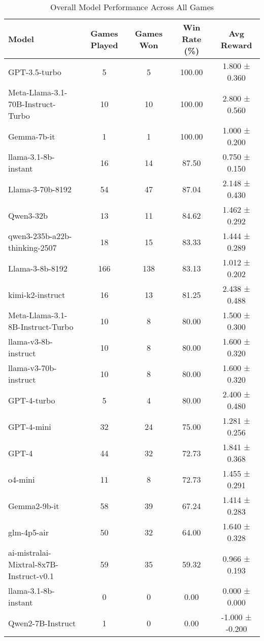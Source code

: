 \begin{table}[htbp]
\centering
\caption{Overall Model Performance Across All Games}
\begin{tabular}{lcccc}
\toprule
Model & Games Played & Games Won & Win Rate (\%) & Avg Reward \\
\midrule
GPT-3.5-turbo & 5 & 5 & 100.00 & 1.800 ± 0.360 \\
Meta-Llama-3.1-70B-Instruct-Turbo & 10 & 10 & 100.00 & 2.800 ± 0.560 \\
Gemma-7b-it & 1 & 1 & 100.00 & 1.000 ± 0.200 \\
llama-3.1-8b-instant & 16 & 14 & 87.50 & 0.750 ± 0.150 \\
Llama-3-70b-8192 & 54 & 47 & 87.04 & 2.148 ± 0.430 \\
Qwen3-32b & 13 & 11 & 84.62 & 1.462 ± 0.292 \\
qwen3-235b-a22b-thinking-2507 & 18 & 15 & 83.33 & 1.444 ± 0.289 \\
Llama-3-8b-8192 & 166 & 138 & 83.13 & 1.012 ± 0.202 \\
kimi-k2-instruct & 16 & 13 & 81.25 & 2.438 ± 0.488 \\
Meta-Llama-3.1-8B-Instruct-Turbo & 10 & 8 & 80.00 & 1.500 ± 0.300 \\
llama-v3-8b-instruct & 10 & 8 & 80.00 & 1.600 ± 0.320 \\
llama-v3-70b-instruct & 10 & 8 & 80.00 & 1.600 ± 0.320 \\
GPT-4-turbo & 5 & 4 & 80.00 & 2.400 ± 0.480 \\
GPT-4-mini & 32 & 24 & 75.00 & 1.281 ± 0.256 \\
GPT-4 & 44 & 32 & 72.73 & 1.841 ± 0.368 \\
o4-mini & 11 & 8 & 72.73 & 1.455 ± 0.291 \\
Gemma2-9b-it & 58 & 39 & 67.24 & 1.414 ± 0.283 \\
glm-4p5-air & 50 & 32 & 64.00 & 1.640 ± 0.328 \\
ai-mistralai-Mixtral-8x7B-Instruct-v0.1 & 59 & 35 & 59.32 & 0.966 ± 0.193 \\
llama-3.1-8b-instant & 0 & 0 & 0.00 & 0.000 ± 0.000 \\
Qwen2-7B-Instruct & 1 & 0 & 0.00 & -1.000 ± -0.200 \\
\bottomrule
\end{tabular}
\end{table}
